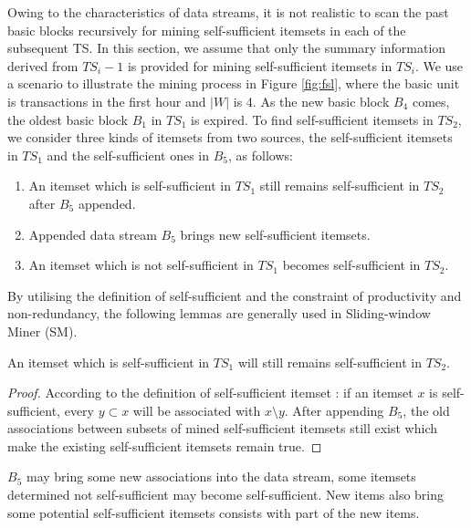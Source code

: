 Owing to the characteristics of data streams, it is not realistic to scan the past basic blocks recursively for mining self-sufficient itemsets in each of the subsequent TS. In this section, we assume that only the summary information derived from $TS_i-1$ is provided for mining self-sufficient itemsets in $TS_i$. We use a scenario to illustrate the mining process in Figure \ref{fig:fsl}, where the basic unit is transactions in the first hour and $|W|$ is 4. As the new basic block $B_4$ comes, the oldest basic block $B_1$ in $TS_1$ is expired. To find self-sufficient itemsets in $TS_2$, we consider three kinds of itemsets from two sources, the self-sufficient itemsets in $TS_1$ and the self-sufficient ones in $B_5$, as follows:

\begin{enumerate}
\item An itemset which is self-sufficient in $TS_1$ still remains self-sufficient in $TS_2$ after $B_5$ appended.
\item Appended data stream $B_5$ brings new self-sufficient itemsets.
\item An itemset which is not self-sufficient in $TS_1$ becomes self-sufficient in $TS_2$.
\end{enumerate} 

By utilising the definition of self-sufficient and the constraint of productivity and non-redundancy, the following lemmas are generally used in Sliding-window Miner (SM).

\begin{lemma}
An itemset which is self-sufficient in $TS_1$ will still remains self-sufficient in $TS_2$.
\end{lemma}

\begin{proof}
According to the definition of self-sufficient itemset \cite{ssi}: if an itemset $x$ is self-sufficient, every $y\subset x$ will be associated with $x\setminus y$. After appending $B_5$, the old associations between subsets of mined self-sufficient itemsets still exist which make the existing self-sufficient itemsets remain true.
\end{proof}

$B_5$ may bring some new associations into the data stream, some itemsets determined not self-sufficient may become self-sufficient. New items also bring some potential self-sufficient itemsets consists with part of the new items.

